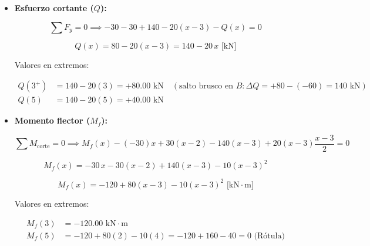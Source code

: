 \begin{itemize}

    \item \textbf{Esfuerzo cortante ($Q$):}

          \begin{equation}

              \sum F_y = 0 \implies -30 - 30 + 140 - 20(x - 3) - Q(x) = 0

          \end{equation}

          \begin{equation}

              \boxed{Q(x) = 80 - 20(x - 3) = 140 - 20\,x\text{ [kN]}}

          \end{equation}

          Valores en extremos:

          \begin{align*}

              Q(3^+) & = 140 - 20(3) = +80.00\text{ kN} \quad (\text{salto brusco en } B: \Delta Q = +80 - (-60) = 140\text{ kN}) \\

              Q(5)   & = 140 - 20(5) = +40.00\text{ kN}

          \end{align*}

    \item \textbf{Momento flector ($M_f$):}

          \begin{equation}

              \sum M_{\text{corte}} = 0 \implies M_f(x) - (-30)x + 30(x - 2) - 140(x - 3) + 20(x - 3)\frac{x - 3}{2} = 0

          \end{equation}

          \begin{equation}

              M_f(x) = -30\,x - 30(x - 2) + 140(x - 3) - 10(x - 3)^2

          \end{equation}

          \begin{equation}

              \boxed{M_f(x) = -120 + 80(x - 3) - 10(x - 3)^2\text{ [kN}\cdot\text{m]}}

          \end{equation}

          Valores en extremos:

          \begin{align*}

              M_f(3) & = -120.00\text{ kN}\cdot\text{m}                             \\

              M_f(5) & = -120 + 80(2) - 10(4) = -120 + 160 - 40 = 0\text{ (Rótula)}

          \end{align*}

\end{itemize}



